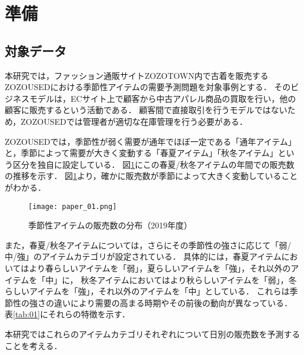 \documentclass[dvipdfmx]{jreport}
\begin{document}
\section{準備}
\subsection{対象データ}
本研究では，ファッション通販サイトZOZOTOWN内で古着を販売するZOZOUSEDにおける季節性アイテムの需要予測問題を対象事例とする．
そのビジネスモデルは，ECサイト上で顧客から中古アパレル商品の買取を行い，他の顧客に販売するという活動である．
顧客間で直接取引を行うモデルではないため，ZOZOUSEDでは管理者が適切な在庫管理を行う必要がある．


ZOZOUSEDでは，季節性が弱く需要が通年でほぼ一定である「通年アイテム」と，季節によって需要が大きく変動する「春夏アイテム」「秋冬アイテム」という区分を独自に設定している．
図\ref{fig:01}にこの春夏/秋冬アイテムの年間での販売数の推移を示す．
図\ref{fig:01}より，確かに販売数が季節によって大きく変動していることがわかる．

\begin{figure}[h]
    \begin{center}
        \texttt{[image: paper\_01.png]} 
        \caption{季節性アイテムの販売数の分布（2019年度）} \label{fig:01}
    \end{center}
\end{figure}

\newpage
また，春夏/秋冬アイテムについては，さらにその季節性の強さに応じて「弱/中/強」のアイテムカテゴリが設定されている．
具体的には，春夏アイテムにおいてはより春らしいアイテムを「弱」，夏らしいアイテムを「強」，それ以外のアイテムを「中」に，
秋冬アイテムにおいてはより秋らしいアイテムを「弱」，冬らしいアイテムを「強」，それ以外のアイテムを「中」としている．
これらは季節性の強さの違いにより需要の高まる時期やその前後の動向が異なっている．
表\ref{tab:01}にそれらの特徴を示す．

本研究ではこれらのアイテムカテゴリそれぞれについて日別の販売数を予測することを考える．
\end{document}
